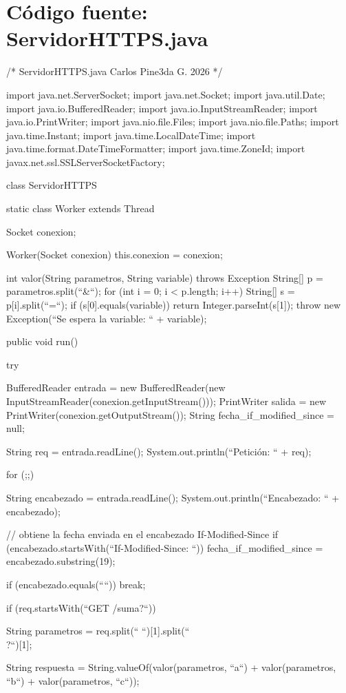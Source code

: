 \documentclass[11pt,a4paper,oneside]{book}
\begin{document}
\chapter{Código fuente: ServidorHTTPS.java}
\begin{SourceCode}
/*
  ServidorHTTPS.java
  Carlos Pine3da G. 2026
*/

import java.net.ServerSocket;
import java.net.Socket;
import java.util.Date;
import java.io.BufferedReader;
import java.io.InputStreamReader;
import java.io.PrintWriter;
import java.nio.file.Files;
import java.nio.file.Paths;
import java.time.Instant;
import java.time.LocalDateTime;
import java.time.format.DateTimeFormatter;
import java.time.ZoneId;
import javax.net.ssl.SSLServerSocketFactory;

class ServidorHTTPS
{
  static class Worker extends Thread
  {
    Socket conexion;

    Worker(Socket conexion)
    {
      this.conexion = conexion;
    }

    int valor(String parametros, String variable) throws Exception
    {
      String[] p = parametros.split(``&``);
      for (int i = 0; i < p.length; i++)
      {
        String[] s = p[i].split(``=``);
        if (s[0].equals(variable))
          return Integer.parseInt(s[1]);
      }
      throw new Exception(``Se espera la variable: `` + variable);
    }

    public void run()
    {
      try
      {
        BufferedReader entrada = new BufferedReader(new InputStreamReader(conexion.getInputStream()));
        PrintWriter salida = new PrintWriter(conexion.getOutputStream());
        String fecha_if_modified_since = null;

        String req = entrada.readLine();
        System.out.println(``Petición: `` + req);

        for (;;)
        {
          String encabezado = entrada.readLine();
          System.out.println(``Encabezado: `` + encabezado);

          // obtiene la fecha enviada en el encabezado If-Modified-Since
          if (encabezado.startsWith(``If-Modified-Since: ``))
	          fecha_if_modified_since = encabezado.substring(19);

          if (encabezado.equals(````)) break;
        }

        if (req.startsWith(``GET /suma?``))
        {
          String parametros = req.split(`` ``)[1].split(``\\?``)[1];

          String respuesta = String.valueOf(valor(parametros, ``a``) + valor(parametros, ``b``) + valor(parametros, ``c``));

}}}}}
\end{SourceCode}
\end{document}
